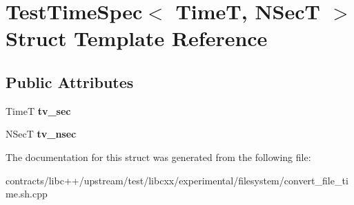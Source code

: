 \hypertarget{struct_test_time_spec}{}\section{Test\+Time\+Spec$<$ TimeT, N\+SecT $>$ Struct Template Reference}
\label{struct_test_time_spec}
\subsection*{Public Attributes}
\begin{DoxyCompactItemize}
\item 
\mbox{\label{struct_test_time_spec_a861d450f7aa55f268e22355b38710e94}} 
TimeT {\bfseries tv\+\_\+sec}
\item 
\mbox{\label{struct_test_time_spec_a485083b453f48b15234c9d80e0c42717}} 
N\+SecT {\bfseries tv\+\_\+nsec}
\end{DoxyCompactItemize}


The documentation for this struct was generated from the following file\+:\begin{DoxyCompactItemize}
\item 
contracts/libc++/upstream/test/libcxx/experimental/filesystem/convert\+\_\+file\+\_\+time.\+sh.\+cpp\end{DoxyCompactItemize}
